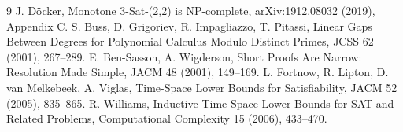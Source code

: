 \documentclass[11pt]{article}
\begin{document}
\begin{thebibliography}{9}
 J. D\"ocker, Monotone 3-Sat-(2,2) is NP-complete,
arXiv:1912.08032 (2019), Appendix C.
 S. Buss, D. Grigoriev, R. Impagliazzo,
T. Pitassi, Linear Gaps Between Degrees for Polynomial Calculus
Modulo Distinct Primes, JCSS 62 (2001), 267--289.
 E. Ben-Sasson, A. Wigderson,
Short Proofs Are Narrow: Resolution Made Simple,
JACM 48 (2001), 149--169.
 L. Fortnow, R. Lipton, D. van Melkebeek,
A. Viglas, Time-Space Lower Bounds for Satisfiability,
JACM 52 (2005), 835--865.
 R. Williams, Inductive Time-Space Lower
Bounds for SAT and Related Problems,
Computational Complexity 15 (2006), 433--470.
\end{thebibliography}
\end{document}
